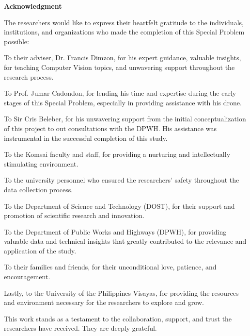 \begin{center}
	\textbf{\Large Acknowledgment}
\end{center}

\vspace{2em}

The researchers would like to express their heartfelt gratitude to the individuals, institutions, and organizations who made the completion of this Special Problem possible:

To their adviser, Dr. Francis Dimzon, for his expert guidance, valuable insights, for teaching Computer Vision topics, and unwavering support throughout the research process.

To Prof. Jumar Cadondon, for lending his time and expertise during the early stages of this Special Problem, especially in providing assistance with his drone.

To Sir Cris Beleber, for his unwavering support from the initial conceptualization of this project to out consultations with the DPWH. His assistance was instrumental in the successful completion of this study.

To the Komsai faculty and staff, for providing a nurturing and intellectually stimulating environment.

To the university personnel who ensured the researchers' safety throughout the data collection process.

To the Department of Science and Technology (DOST), for their support and promotion of scientific research and innovation.

To the Department of Public Works and Highways (DPWH), for providing valuable data and technical insights that greatly contributed to the relevance and application of the study.

To their families and friends, for their unconditional love, patience, and encouragement.

Lastly, to the University of the Philippines Visayas, for providing the resources and environment necessary for the researchers to explore and grow.

This work stands as a testament to the collaboration, support, and trust the researchers have received. They are deeply grateful.